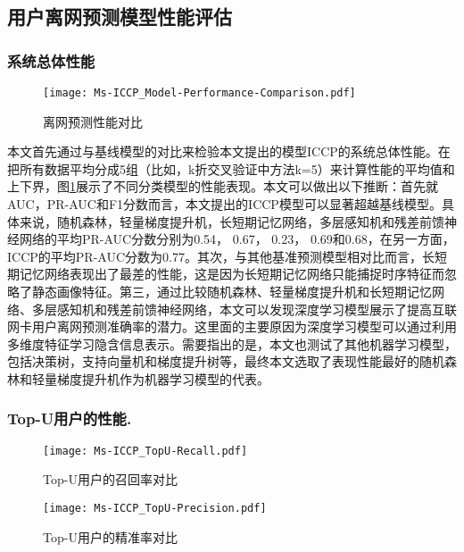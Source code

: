 \subsection{用户离网预测模型性能评估}
\subsubsection{系统总体性能}
\begin{figure}[hbt]
	\centering
	\texttt{[image: Ms-ICCP\_Model-Performance-Comparison.pdf]}
	\caption{离网预测性能对比}
	\label{Fig:Model-Performance-Comparison}
\end{figure}
本文首先通过与基线模型的对比来检验本文提出的模型ICCP的系统总体性能。在把所有数据平均分成5组（比如，k折交叉验证中方法k=5）来计算性能的平均值和上下界，图\ref{Fig:Model-Performance-Comparison}展示了不同分类模型的性能表现。本文可以做出以下推断：首先就AUC，PR-AUC和F1分数而言，本文提出的ICCP模型可以显著超越基线模型。具体来说，随机森林，轻量梯度提升机，长短期记忆网络，多层感知机和残差前馈神经网络的平均PR-AUC分数分别为0.54， 0.67， 0.23， 0.69和0.68，在另一方面，ICCP的平均PR-AUC分数为0.77。其次，与其他基准预测模型相对比而言，长短期记忆网络表现出了最差的性能，这是因为长短期记忆网络只能捕捉时序特征而忽略了静态画像特征。第三，通过比较随机森林、轻量梯度提升机和长短期记忆网络、多层感知机和残差前馈神经网络，本文可以发现深度学习模型展示了提高互联网卡用户离网预测准确率的潜力。这里面的主要原因为深度学习模型可以通过利用多维度特征学习隐含信息表示。需要指出的是，本文也测试了其他机器学习模型，包括决策树，支持向量机和梯度提升树等，最终本文选取了表现性能最好的随机森林和轻量梯度提升机作为机器学习模型的代表。

\subsubsection{Top-U用户的性能.}
\begin{figure}[hbt]
	\centering
	\texttt{[image: Ms-ICCP\_TopU-Recall.pdf]}
	\caption{Top-U用户的召回率对比}
	\label{Fig:TopU-Recall}
\end{figure}

\begin{figure}[hbt]
	\centering
	\texttt{[image: Ms-ICCP\_TopU-Precision.pdf]}
	\caption{Top-U用户的精准率对比}
	\label{Fig:TopU-Precision}
\end{figure}

